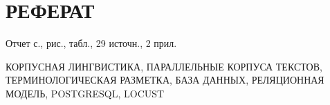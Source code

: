 \section*{РЕФЕРАТ}

Отчет \pageref{LastPage} с.,  рис.,  табл., 29 источн., 2 прил.

КОРПУСНАЯ ЛИНГВИСТИКА,
ПАРАЛЛЕЛЬНЫЕ КОРПУСА ТЕКСТОВ,
ТЕРМИНОЛОГИЧЕСКАЯ РАЗМЕТКА,
БАЗА ДАННЫХ,
РЕЛЯЦИОННАЯ МОДЕЛЬ,
POSTGRESQL,
LOCUST

